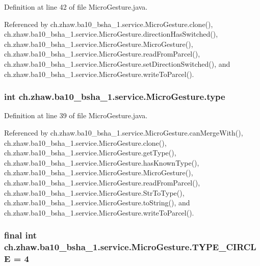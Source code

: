 Definition at line 42 of file MicroGesture.java.

Referenced by ch.zhaw.ba10\_\-bsha\_\-1.service.MicroGesture.clone(), ch.zhaw.ba10\_\-bsha\_\-1.service.MicroGesture.directionHasSwitched(), ch.zhaw.ba10\_\-bsha\_\-1.service.MicroGesture.MicroGesture(), ch.zhaw.ba10\_\-bsha\_\-1.service.MicroGesture.readFromParcel(), ch.zhaw.ba10\_\-bsha\_\-1.service.MicroGesture.setDirectionSwitched(), and ch.zhaw.ba10\_\-bsha\_\-1.service.MicroGesture.writeToParcel().\hypertarget{classch_1_1zhaw_1_1ba10__bsha__1_1_1service_1_1MicroGesture_ac1ee8b835a0b20d0e3535682eb0d2741}{
\subsubsection[{type}]{\setlength{\rightskip}{0pt plus 5cm}int {\bf ch.zhaw.ba10\_\-bsha\_\-1.service.MicroGesture.type}}}
\label{classch_1_1zhaw_1_1ba10__bsha__1_1_1service_1_1MicroGesture_ac1ee8b835a0b20d0e3535682eb0d2741}


Definition at line 39 of file MicroGesture.java.

Referenced by ch.zhaw.ba10\_\-bsha\_\-1.service.MicroGesture.canMergeWith(), ch.zhaw.ba10\_\-bsha\_\-1.service.MicroGesture.clone(), ch.zhaw.ba10\_\-bsha\_\-1.service.MicroGesture.getType(), ch.zhaw.ba10\_\-bsha\_\-1.service.MicroGesture.hasKnownType(), ch.zhaw.ba10\_\-bsha\_\-1.service.MicroGesture.MicroGesture(), ch.zhaw.ba10\_\-bsha\_\-1.service.MicroGesture.readFromParcel(), ch.zhaw.ba10\_\-bsha\_\-1.service.MicroGesture.StrToType(), ch.zhaw.ba10\_\-bsha\_\-1.service.MicroGesture.toString(), and ch.zhaw.ba10\_\-bsha\_\-1.service.MicroGesture.writeToParcel().\hypertarget{classch_1_1zhaw_1_1ba10__bsha__1_1_1service_1_1MicroGesture_ac8268cb939b8bae2cf1791b4bbeb422d}{
\subsubsection[{TYPE\_\-CIRCLE}]{\setlength{\rightskip}{0pt plus 5cm}final int {\bf ch.zhaw.ba10\_\-bsha\_\-1.service.MicroGesture.TYPE\_\-CIRCLE} = 4}}
\label{classch_1_1zhaw_1_1ba10__bsha__1_1_1service_1_1MicroGesture_ac8268cb939b8bae2cf1791b4bbeb422d}



